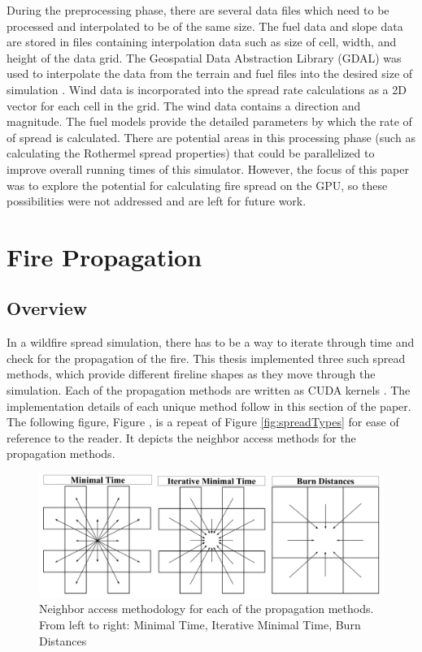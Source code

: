 During the preprocessing phase, there are several data files which need to be processed and interpolated to be of the same size. The fuel data and slope data are stored in files containing interpolation data such as size of cell, width, and height of the data grid. The Geospatial Data Abstraction Library (GDAL) was used to interpolate the data from the terrain and fuel files into the desired size of simulation \cite{GDAL}. Wind data is incorporated into the spread rate calculations as a 2D vector for each cell in the grid. The wind data contains a direction and magnitude. The fuel models provide the detailed parameters by which the rate of of spread is calculated. There are potential areas in this processing phase (such as calculating the Rothermel spread properties) that could be parallelized to improve overall running times of this simulator. However, the focus of this paper was to explore the potential for calculating fire spread on the GPU, so these possibilities were not addressed and are left for future work. 


\section{Fire Propagation}
\subsection{Overview}
In a wildfire spread simulation, there has to be a way to iterate through time and check for the propagation of the fire. This thesis implemented three such spread methods, which provide different fireline shapes as they move through the simulation. Each of the propagation methods are written as CUDA kernels \cite{cuda}. The implementation details of each unique method follow in this section of the paper. The following figure, Figure \label{fig:spreadTypes_2}, is a repeat of Figure \ref{fig:spreadTypes} for ease of reference to the reader. It depicts the neighbor access methods for the propagation methods.

\begin{figure}%
\centering
\includegraphics[width=\linewidth]{figures/background/spread_methods.PNG}
\caption{Neighbor access methodology for each of the propagation methods. From left to right: Minimal Time, Iterative Minimal Time, Burn Distances}
\label{fig:spreadTypes_2}
\end{figure}


